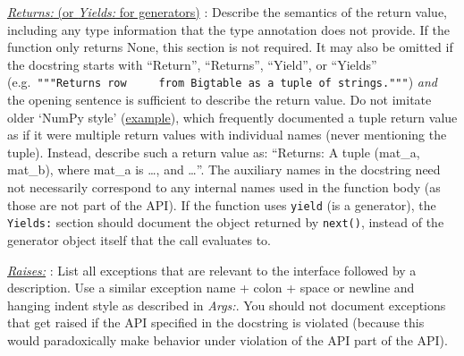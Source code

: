 \documentclass[
]{article}
\begin{document}
\hyperref[doc-function-returns]{\emph{Returns:} (or \emph{Yields:} for
generators)} : Describe the semantics of the return value, including any
type information that the type annotation does not provide. If the
function only returns None, this section is not required. It may also be
omitted if the docstring starts with ``Return'', ``Returns'', ``Yield'',
or ``Yields''
(e.g.~\texttt{"""Returns\ row\ \ \ \ \ from\ Bigtable\ as\ a\ tuple\ of\ strings."""})
\emph{and} the opening sentence is sufficient to describe the return
value. Do not imitate older `NumPy style'
(\href{https://numpy.org/doc/1.24/reference/generated/numpy.linalg.qr.html}{example}),
which frequently documented a tuple return value as if it were multiple
return values with individual names (never mentioning the tuple).
Instead, describe such a return value as: ``Returns: A tuple (mat\_a,
mat\_b), where mat\_a is \ldots, and \ldots{}''. The auxiliary names in
the docstring need not necessarily correspond to any internal names used
in the function body (as those are not part of the API). If the function
uses \texttt{yield} (is a generator), the \texttt{Yields:} section
should document the object returned by \texttt{next()}, instead of the
generator object itself that the call evaluates to.

\hyperref[doc-function-raises]{\emph{Raises:}} : List all exceptions
that are relevant to the interface followed by a description. Use a
similar exception name + colon + space or newline and hanging indent
style as described in \emph{Args:}. You should not document exceptions
that get raised if the API specified in the docstring is violated
(because this would paradoxically make behavior under violation of the
API part of the API).
\end{document}
